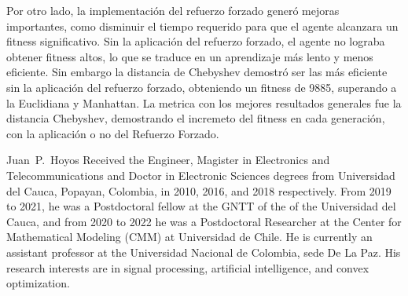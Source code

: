 \documentclass[lettersize, journal]{IEEEtran}
\begin{document}
Por otro lado, la implementación del refuerzo forzado generó mejoras importantes, como disminuir el tiempo requerido para que el agente alcanzara un fitness significativo. Sin la aplicación del refuerzo forzado, el agente no lograba obtener fitness altos, lo que se traduce en un aprendizaje más lento y menos eficiente. Sin embargo la distancia de Chebyshev demostró ser las más eficiente sin la aplicación del refuerzo forzado, obteniendo un fitness de 9885, superando a la Euclidiana y Manhattan. La metrica con los mejores resultados generales fue la distancia Chebyshev, demostrando el incremeto del fitness en cada generación, con la aplicación o no del Refuerzo Forzado.
\printbibliography

\begin{IEEEbiography}{Juan~P.~Hoyos}
Received the Engineer, Magister in Electronics and Telecommunications and Doctor in Electronic Sciences degrees from Universidad del Cauca, Popayan, Colombia, in 2010, 2016, and 2018 respectively. From 2019 to 2021, he was a Postdoctoral fellow at the GNTT of the of the Universidad del Cauca, and from 2020 to 2022 he was a Postdoctoral Researcher at the Center for Mathematical Modeling (CMM) at Universidad de Chile. He is currently an assistant professor at the Universidad Nacional de Colombia, sede De La Paz. His research interests are in signal processing, artificial intelligence, and convex optimization.
\end{IEEEbiography}
\end{document}
